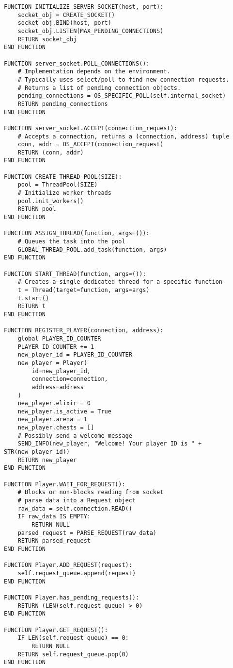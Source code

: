 \documentclass{article}
\begin{document}
\begin{lstlisting}[style=pseudo]
FUNCTION INITIALIZE_SERVER_SOCKET(host, port):
    socket_obj = CREATE_SOCKET()
    socket_obj.BIND(host, port)
    socket_obj.LISTEN(MAX_PENDING_CONNECTIONS)
    RETURN socket_obj
END FUNCTION

FUNCTION server_socket.POLL_CONNECTIONS():
    # Implementation depends on the environment.
    # Typically uses select/poll to find new connection requests.
    # Returns a list of pending connection objects.
    pending_connections = OS_SPECIFIC_POLL(self.internal_socket)
    RETURN pending_connections
END FUNCTION

FUNCTION server_socket.ACCEPT(connection_request):
    # Accepts a connection, returns a (connection, address) tuple
    conn, addr = OS_ACCEPT(connection_request)
    RETURN (conn, addr)
END FUNCTION

FUNCTION CREATE_THREAD_POOL(SIZE):
    pool = ThreadPool(SIZE)
    # Initialize worker threads
    pool.init_workers()
    RETURN pool
END FUNCTION

FUNCTION ASSIGN_THREAD(function, args=()):
    # Queues the task into the pool
    GLOBAL_THREAD_POOL.add_task(function, args)
END FUNCTION

FUNCTION START_THREAD(function, args=()):
    # Creates a single dedicated thread for a specific function
    t = Thread(target=function, args=args)
    t.start()
    RETURN t
END FUNCTION

FUNCTION REGISTER_PLAYER(connection, address):
    global PLAYER_ID_COUNTER
    PLAYER_ID_COUNTER += 1
    new_player_id = PLAYER_ID_COUNTER
    new_player = Player(
        id=new_player_id,
        connection=connection,
        address=address
    )
    new_player.elixir = 0
    new_player.is_active = True
    new_player.arena = 1
    new_player.chests = []
    # Possibly send a welcome message
    SEND_INFO(new_player, "Welcome! Your player ID is " + STR(new_player_id))
    RETURN new_player
END FUNCTION

FUNCTION Player.WAIT_FOR_REQUEST():
    # Blocks or non-blocks reading from socket
    # parse data into a Request object
    raw_data = self.connection.READ()
    IF raw_data IS EMPTY:
        RETURN NULL
    parsed_request = PARSE_REQUEST(raw_data)
    RETURN parsed_request
END FUNCTION

FUNCTION Player.ADD_REQUEST(request):
    self.request_queue.append(request)
END FUNCTION

FUNCTION Player.has_pending_requests():
    RETURN (LEN(self.request_queue) > 0)
END FUNCTION

FUNCTION Player.GET_REQUEST():
    IF LEN(self.request_queue) == 0:
        RETURN NULL
    RETURN self.request_queue.pop(0)
END FUNCTION


\end{lstlisting}
\end{document}
